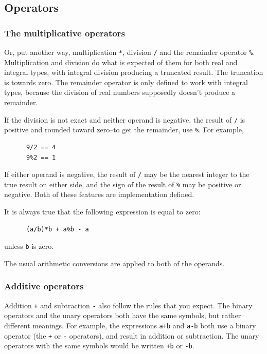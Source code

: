    

  

  \subsection{Operators}
   

   \subsubsection{The multiplicative operators}
    

    Or, put another way, multiplication \texttt{*},
     division \texttt{/} and the remainder
     operator \texttt{\%}. Multiplication and division do what is
     expected of them for both real and integral types, with integral division
     producing a truncated result. The truncation is towards zero. The
     remainder operator is only defined to work with integral types, because
     the division of real numbers supposedly doesn't produce a remainder.


    If the division is not exact and neither operand is negative, the
     result of \texttt{/} is positive and rounded toward zero--to
     get the remainder, use \texttt{\%}. For example,


    \begin{Verbatim}
      9/2 == 4
      9%2 == 1
    \end{Verbatim}

    If either operand is negative, the result of \texttt{/} may be
     the nearest integer to the true result on either side, and the sign of
     the result of \texttt{\%} may be positive or negative. Both of
     these features are implementation defined.


    It is always true that the following expression is equal to zero:


    \begin{Verbatim}
      (a/b)*b + a%b - a
    \end{Verbatim}

    unless \texttt{b} is zero.


    The usual arithmetic conversions are applied to both of the
     operands.


   

   \subsubsection{Additive operators}
    

    Addition \texttt{+} and subtraction \texttt{-} also
     follow the rules that you expect. The binary operators and the unary
     operators both have the same symbols, but rather different meanings. For
     example, the expressions \texttt{a+b} and \texttt{a-b}
     both use a binary operator (the \texttt{+}
     or \texttt{-} operators), and result in addition or subtraction.
     The unary operators with the same symbols would be
     written \texttt{+b} or \texttt{-b}.


